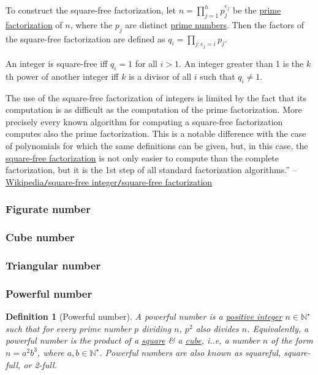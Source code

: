 \documentclass{article}
\newtheorem{definition}{Definition}
\begin{document}
To construct the square-free factorization, let $n = \prod_{j=1}^h p_j^{e_j}$ be the \href{https://en.wikipedia.org/wiki/Prime_factorization}{prime factorization} of $n$, where the $p_j$ are distinct \href{https://en.wikipedia.org/wiki/Prime_number}{prime numbers}. Then the factors of the square-free factorization are defined as $q_i = \prod_{j:e_j = i} p_j$.

An integer is square-free iff $q_i = 1$ for all $i > 1$. An integer greater than 1 is the $k$th power of another integer iff $k$ is a divisor of all $i$ such that $q_i\ne1$.

The use of the square-free factorization of integers is limited by the fact that its computation is as difficult as the computation of the prime factorization. More precisely every known algorithm for computing a square-free factorization computes also the prime factorization. This is a notable difference with the case of polynomials for which the same definitions can be given, but, in this case, the \href{https://en.wikipedia.org/wiki/Square-free_factorization}{square-free factorization} is not only easier to compute than the complete factorization, but it is the 1st step of all standard factorization algorithms.'' -- \href{https://en.wikipedia.org/wiki/Square-free_integer#Square-free_factorization}{Wikipedia\texttt{/}square-free integer\texttt{/}square-free factorization}

\subsubsection{Figurate number}

\subsubsection{Cube number}

\subsubsection{Triangular number}

\subsubsection{Powerful number}

\begin{definition}[Powerful number]
	A \emph{powerful number} is a \href{https://en.wikipedia.org/wiki/Positive_integer}{positive integer} $n\in\mathbb{N}^\star$ such that for every prime number $p$ dividing $n$, $p^2$ also divides $n$. Equivalently, a powerful number is the product of a \href{https://en.wikipedia.org/wiki/Square_number}{square} \& a \href{https://en.wikipedia.org/wiki/Cube_(arithmetic)}{cube}, i..e, a number $n$ of the form $n = a^2b^3$, where $a,b\in\mathbb{N}^\star$. Powerful numbers are also known as \emph{squareful, square-full}, or \emph{2-full}.
\end{definition}
\end{document}
